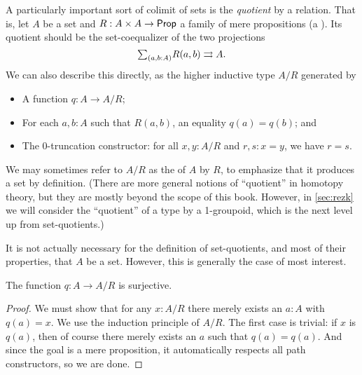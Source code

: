 A particularly important sort of colimit of sets is the \emph{quotient} by a relation.
That is, let $A$ be a set and $R:A\times A \to \mathsf{Prop}$ a family of mere propositions (a ).
%
%
Its quotient should be the set-coequalizer of the two projections
\[ \tsm{a,b:A} R(a,b) \rightrightarrows A. \]
We can also describe this directly, as the higher inductive type $A/R$ generated by
%
%
%
\begin{itemize}
\item A function $q:A\to A/R$;
\item For each $a,b:A$ such that $R(a,b)$, an equality $q(a)=q(b)$; and
\item The $0$-truncation constructor: for all $x,y:A/R$ and $r,s:x=y$, we have $r=s$.
\end{itemize}
We may sometimes refer to $A/R$ as the  of $A$ by $R$, to emphasize that it produces a set by definition.
(There are more general notions of ``quotient'' in homotopy theory, but they are mostly beyond the scope of this book.
However, in \autoref{sec:rezk} we will consider the ``quotient'' of a type by a 1-groupoid, which is the next level up from set-quotients.)

\begin{rmk}
  It is not actually necessary for the definition of set-quotients, and most of their properties, that $A$ be a set.
  However, this is generally the case of most interest.
\end{rmk}

\begin{lem}\label{thm:quotient-surjective}
  The function $q:A\to A/R$ is surjective.
\end{lem}
\begin{proof}
  We must show that for any $x:A/R$ there merely exists an $a:A$ with $q(a)=x$.
  We use the induction principle of $A/R$.
  The first case is trivial: if $x$ is $q(a)$, then of course there merely exists an $a$ such that $q(a)=q(a)$.
  And since the goal is a mere proposition, it automatically respects all path constructors, so we are done.
\end{proof}

